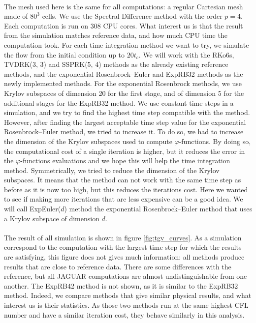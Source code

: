       \paragraph{}
      The mesh used here is the same for all computations: a regular Cartesian mesh made of $80^3$ cells.
      We use the Spectral Difference method with the order $p = 4$.
      Each computation is run on 308 CPU cores.
      What interest us is that the result from the simulation matches reference data, and how much CPU time the computation took.
      For each time integration method we want to try, we simulate the flow from the initial condition up to $20 t_c$.
      We will work with the RKo6s, TVDRK(3, 3) and SSPRK(5, 4) methods as the already existing reference methods, and the exponential Rosenbrock--Euler and ExpRB32 methods as the newly implemented methods.
      For the exponential Rosenbrock methods, we use Krylov subspaces of dimension 20 for the first stage, and of dimension 5 for the additional stages for the ExpRB32 method.
      We use constant time steps in a simulation, and we try to find the highest time step compatible with the method.
      However, after finding the largest acceptable time step value for the exponential Rosenbrock--Euler method, we tried to increase it.
      To do so, we had to increase the dimension of the Krylov subspaces used to compute $\varphi$-functions.
      By doing so, the computational cost of a single iteration is higher, but it reduces the error in the $\varphi$-functions evaluations and we hope this will help the time integration method.
      Symmetrically, we tried to reduce the dimension of the Krylov subspaces.
      It means that the method can not work with the same time step as before as it is now too high, but this reduces the iterations cost.
      Here we wanted to see if making more iterations that are less expensive can be a good idea.
      We will call ExpEuler($d$) method the exponential Rosenbrock--Euler method that uses a Krylov subspace of dimension $d$.

      \paragraph{}
      The result of all simulation is shown in figure \ref{fig:tgv_curves}.
      As a simulation correspond to the computation with the largest time step for which the results are satisfying, this figure does not gives much information: all methods produce results that are close to reference data.
      There are some differences with the reference, but all JAGUAR computations are almost undistinguishable from one another.
      The ExpRB42 method is not shown, as it is similar to the ExpRB32 method.
      Indeed, we compare methods that give similar physical results, and what interest us is their statistics.
      As those two methods run at the same highest CFL number and have a similar iteration cost, they behave similarly in this analysis.

